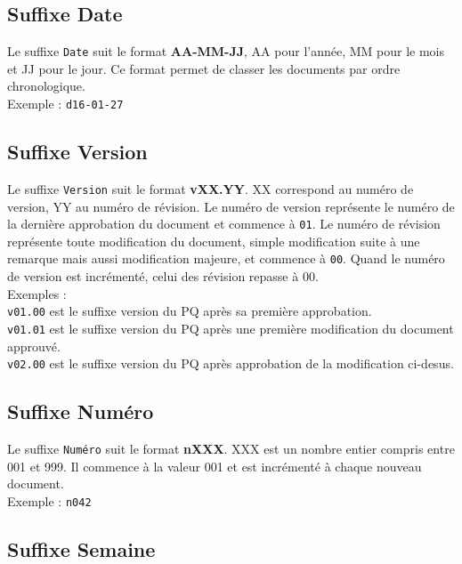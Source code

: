 \subsection{Suffixe Date}
\label{suffixe_date}

Le suffixe \verb+Date+ suit le format \textbf{AA-MM-JJ}, AA pour l'année, MM pour le mois et JJ pour le jour. Ce format permet de classer les documents par ordre chronologique.\\

Exemple : \verb+d16-01-27+

\subsection{Suffixe Version}
\label{suffixe_version}

Le suffixe \verb+Version+ suit le format \textbf{vXX.YY}. XX correspond au numéro de version, YY au numéro de révision. Le numéro de version représente le numéro de la dernière approbation du document et commence à \verb+01+. Le numéro de révision représente toute modification du document, simple modification suite à une remarque mais aussi modification majeure, et commence à \verb+00+.  Quand le numéro de version est incrémenté, celui des révision repasse à 00.\\

Exemples :\\
\verb+v01.00+ est le suffixe version du PQ après sa première approbation.\\
\verb+v01.01+ est le suffixe version du PQ après une première modification du document approuvé.\\
\verb+v02.00+ est le suffixe version du PQ après approbation de la modification ci-desus.\\

\subsection{Suffixe Numéro}
\label{suffixe_numero}

Le suffixe \verb+Numéro+ suit le format \textbf{nXXX}. XXX est un nombre entier compris entre 001 et 999. Il commence à la valeur 001 et est incrémenté à chaque nouveau document.\\

Exemple : \verb+n042+\\

\subsection{Suffixe Semaine}
\label{suffixe_semaine}


